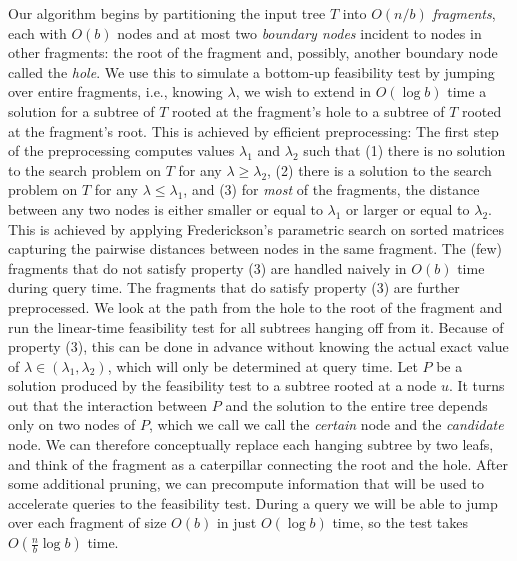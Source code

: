 \documentclass[11pt,a4paper]{article}
\theoremstyle{definition}
\theoremstyle{remark}
\begin{document}
Our algorithm begins by partitioning the input tree $T$ into $O(n/b)$ {\em fragments}, each with $O(b)$ nodes and at most two {\em boundary nodes} incident to nodes in other fragments: the root of the fragment and, possibly, another boundary node called the {\em hole}.
We use this to simulate a bottom-up feasibility test by jumping over entire 
fragments, i.e., knowing $\lambda$, we wish to extend in $O(\log b)$ time a solution for a subtree of $T$ rooted at the fragment's hole to a subtree of $T$ rooted at the fragment's root. This is achieved by efficient preprocessing: 
% 
The first step of the preprocessing computes values $\lambda_1$ and  $\lambda_2$ such that (1) there is no solution to the search problem on $T$ for any $\lambda \geq \lambda_2$, (2) there is a solution to the search problem on $T$ for any $\lambda \le \lambda_1$, and (3) for {\em most} of the fragments, the distance between any two nodes is either smaller or equal to $\lambda_1$ or larger or equal to $\lambda_2$. This is achieved by applying Frederickson's parametric search on sorted matrices capturing the pairwise distances between nodes in the same fragment. The (few) fragments that do not satisfy property (3) are handled naively in $O(b)$ time during query time. 
The fragments that do satisfy property (3) are further preprocessed. We look at the path from the hole to the root of the
fragment and run the linear-time feasibility test for all subtrees hanging off from it. Because of property (3), this can be done in advance without knowing the actual exact value of $\lambda \in (\lambda_1,\lambda_2)$, which will only be determined at query time. 
Let $P$ be a solution produced by the feasibility test to a subtree rooted at a node $u$. It turns out that the interaction between $P$ and the solution to the entire tree depends only on two nodes of $P$, which we call we call the {\em certain} node and the {\em candidate} node. We can therefore conceptually replace each hanging subtree by two leafs, and think of the fragment as a caterpillar connecting the root and the hole. 
After some additional pruning, we can precompute information 
that will be used to accelerate queries to the feasibility test. During a query we will be able to jump over each fragment of size $O(b)$ in just $O(\log b)$ time, so the test takes $O(\frac{n}{b}\log b)$ time.
\end{document}

